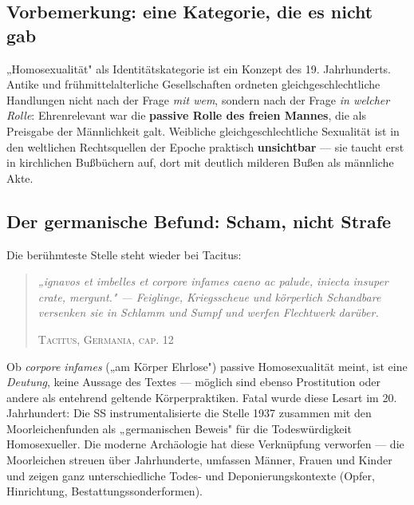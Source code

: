 \documentclass[11pt,a4paper,ngerman]{scrartcl}
\newcommand{\chipbase}[2]{\hspace{0pt}{\footnotesize\textcolor{#1}{[\textsc{#2}]}}}
\newcommand{\chipbelegt}[1]{\chipbase{chipgreen}{#1}}
\newcommand{\chipumstritten}[1]{\chipbase{chipred}{#1}}
\begin{document}
\subsection*{Vorbemerkung: eine Kategorie, die es nicht gab}

„Homosexualität" als Identitätskategorie ist ein Konzept des 19. Jahrhunderts. Antike und frühmittelalterliche Gesellschaften ordneten gleichgeschlechtliche Handlungen nicht nach der Frage \emph{mit wem}, sondern nach der Frage \emph{in welcher Rolle}: Ehrenrelevant war die \textbf{passive Rolle des freien Mannes}, die als Preisgabe der Männlichkeit galt. Weibliche gleichgeschlechtliche Sexualität ist in den weltlichen Rechtsquellen der Epoche praktisch \textbf{unsichtbar} — sie taucht erst in kirchlichen Bußbüchern auf, dort mit deutlich milderen Bußen als männliche Akte. \chipbelegt{belegt}

\subsection*{Der germanische Befund: Scham, nicht Strafe}

Die berühmteste Stelle steht wieder bei Tacitus:

\begin{quotation}\small\itshape
„ignavos et imbelles et corpore infames caeno ac palude, iniecta insuper crate, mergunt." — Feiglinge, Kriegsscheue und körperlich Schandbare versenken sie in Schlamm und Sumpf und werfen Flechtwerk darüber.
\par\nopagebreak\smallskip\hfill{\footnotesize\upshape\textsc{Tacitus, Germania, cap. 12}}
\end{quotation}

Ob \emph{corpore infames} („am Körper Ehrlose") passive Homosexualität meint, ist eine \emph{Deutung}, keine Aussage des Textes — möglich sind ebenso Prostitution oder andere als entehrend geltende Körperpraktiken. \chipumstritten{umstritten} Fatal wurde diese Lesart im 20. Jahrhundert: Die SS instrumentalisierte die Stelle 1937 zusammen mit den Moorleichenfunden als „germanischen Beweis" für die Todeswürdigkeit Homosexueller. Die moderne Archäologie hat diese Verknüpfung verworfen — die Moorleichen streuen über Jahrhunderte, umfassen Männer, Frauen und Kinder und zeigen ganz unterschiedliche Todes- und Deponierungskontexte (Opfer, Hinrichtung, Bestattungssonderformen). \chipbelegt{belegt}
\end{document}
